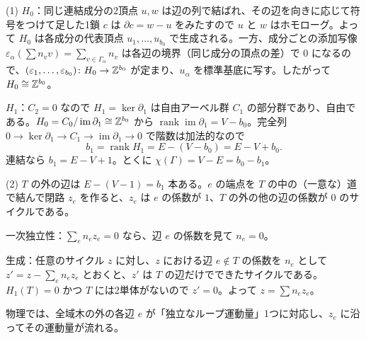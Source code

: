 \begin{solution}
(1) $H_0$：同じ連結成分の2頂点 $u,w$ は辺の列で結ばれ、その辺を向きに応じて符号をつけて足した1鎖 $c$ は $\partial c=w-u$ をみたすので $u$ と $w$ はホモローグ。よって $H_0$ は各成分の代表頂点 $u_1,\dots,u_{b_0}$ で生成される。一方、成分ごとの添加写像 $\varepsilon_\alpha(\sum n_vv)=\sum_{v\in\Gamma_\alpha}n_v$ は各辺の境界（同じ成分の頂点の差）で $0$ になるので、$(\varepsilon_1,\dots,\varepsilon_{b_0})\colon H_0\to\mathbb{Z}^{b_0}$ が定まり、$u_\alpha$ を標準基底に写す。したがって $H_0\cong\mathbb{Z}^{b_0}$。

$H_1$：$C_2=0$ なので $H_1=\ker\partial_1$ は自由アーベル群 $C_1$ の部分群であり、自由である。$H_0=C_0/\operatorname{im}\partial_1\cong\mathbb{Z}^{b_0}$ から $\operatorname{rank}\operatorname{im}\partial_1=V-b_0$。完全列 $0\to\ker\partial_1\to C_1\to\operatorname{im}\partial_1\to0$ で階数は加法的なので
\[
b_1=\operatorname{rank}H_1=E-(V-b_0)=E-V+b_0 .
\]
連結なら $b_1=E-V+1$。とくに $\chi(\Gamma)=V-E=b_0-b_1$。

(2) $T$ の外の辺は $E-(V-1)=b_1$ 本ある。$e$ の端点を $T$ の中の（一意な）道で結んで閉路 $z_e$ を作ると、$z_e$ は $e$ の係数が $1$、$T$ の外の他の辺の係数が $0$ のサイクルである。

一次独立性：$\sum_en_ez_e=0$ なら、辺 $e$ の係数を見て $n_e=0$。

生成：任意のサイクル $z$ に対し、$z$ における辺 $e\notin T$ の係数を $n_e$ として $z'=z-\sum_en_ez_e$ とおくと、$z'$ は $T$ の辺だけでできたサイクルである。$H_1(T)=0$ かつ $T$ には2単体がないので $z'=0$。よって $z=\sum n_ez_e$。

物理では、全域木の外の各辺 $e$ が「独立なループ運動量」1つに対応し、$z_e$ に沿ってその運動量が流れる。
\end{solution}


